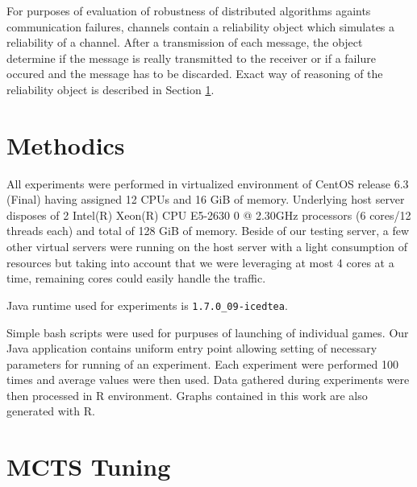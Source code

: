 For purposes of evaluation of robustness of distributed algorithms againts communication
failures, channels contain a reliability object which simulates a reliability of a channel.
After a transmission of each message, the object determine if the message is really transmitted
to the receiver or if a failure occured and the message has to be discarded. Exact way of
reasoning of the reliability object is described in Section \ref{sec_methodics}.



\section{Methodics}
\label{sec_methodics}

All experiments were performed in virtualized environment of CentOS release 6.3 (Final) having
assigned 12 CPUs and 16 GiB of memory. Underlying host server disposes of 2 Intel(R) Xeon(R) 
CPU E5-2630 0 @ 2.30GHz processors (6 cores/12 threads each) and total of 128 GiB of memory.
Beside of our testing server, a few other virtual servers were running on the host server with
a light consumption of resources but taking into account that we were leveraging at most 4
cores at a time, remaining cores could easily handle the traffic. 


Java runtime used for experiments is \texttt{1.7.0\_09-icedtea}.

Simple bash scripts were used for purpuses of launching of individual games. Our Java
application contains uniform entry point allowing setting of necessary parameters for running
of an experiment. Each experiment were performed 100 times and average values were then used.
Data gathered during experiments were then processed in R environment. Graphs contained in this
work are also generated with R.

\section{MCTS Tuning}

